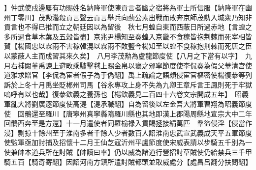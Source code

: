 】仲武使戍邊屢有功賜姓名納降軍使陳貢言者幽之宿將為軍士所信服【納降軍在幽州丁零川】茂勲濳殺貢言聲云貢言舉兵向薊公素出戰而敗奔京師茂勲入城衆乃知非貢言也不得已推而立之朝廷因以為留後　秋七月蝗自東而西蔽日所過赤地【言蝗之多所過食草木葉及五穀皆盡】京兆尹楊知至奏蝗入京畿不食稼皆抱荆棘而死宰相皆賀【楊國忠以霖雨不害稼韓滉以霖雨不敗鹽今楊知至以蝗不食稼抱荆棘而死唐之臣以蒙蔽人主而成習其來久矣】　八月李茂勲為盧龍節度使【八月之下當有以字】　九月右補闕董禹諫上遊畋乘驢擊毬上賜金帛以褒之邠寧節度使李侃奏為假父華清宫使道雅求贈官【李侃為宦者假子為于偽翻】禹上疏論之語頗侵宦官樞密使楊復㳟等列訴於上冬十月禹坐貶郴州司馬【谷永專攻上身不失為九卿王章斥言王鳳則死于牢獄嗚呼有以也哉】復㳟欽義之養孫也【楊欽義見二百四十六卷文宗開成五年】　昭義軍亂大將劉廣逐節度使高湜【湜承職翻】自為留後以左金吾大將軍曹翔為昭義節度使　回鶻還至羅川【唐寧州真寧縣隋羅川縣也其地即漢上郡陽周縣地宣宗大中二年回鶻西奔至是方還】十一月遣使者同羅榆禄入貢賜拯接絹萬匹　羣盜侵淫【侵當作浸】剽掠十餘州至于淮南多者千餘人少者數百人詔淮南忠武宣武義成天平五軍節度使監軍亟加討捕及招懷十二月王仙芝寇沂州平盧節度使宋威表請以步騎五千别為一使兼帥本道兵所在討賊【帥讀曰率】仍以威為諸道行營招討草賊使仍給禁兵三千甲騎五百【騎奇寄翻】因詔河南方鎮所遣討賊都頭並取威處分【處昌呂翻分扶問翻】

